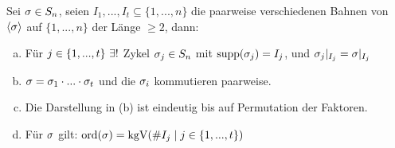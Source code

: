 \documentclass[a4paper]{report}
\begin{document}
\begin{satz}
  Sei $\sigma \in S_n$, seien $I_{1}, ..., I_{t} \subseteq \{1, ..., n\}$ die paarweise verschiedenen Bahnen von $\langle \sigma \rangle$ auf $\{1, ..., n\}$ der Länge $\ge 2$, dann:
  \begin{enumerate}[(a)]
    \item Für $j \in \{1, ..., t\}\ \exists !$ Zykel $\sigma_{j} \in S_n$ mit $\operatorname{supp}(\sigma_{j}) =I_{j}$, und $\sigma_{j}|_{I_{j}} = \sigma|_{I_{j}}$
    \item $\sigma = \sigma_{1} \cdot ... \cdot \sigma_{t}$ und die $\sigma_{i}$ kommutieren paarweise.
    \item Die Darstellung in (b) ist eindeutig bis auf Permutation der Faktoren.
    \item Für $\sigma$ gilt: \(\operatorname{ord}(\sigma) = \operatorname{kgV}(\# I_{j} \mid j \in \{1, ..., t\})\)
  \end{enumerate}
\end{satz}
\end{document}
